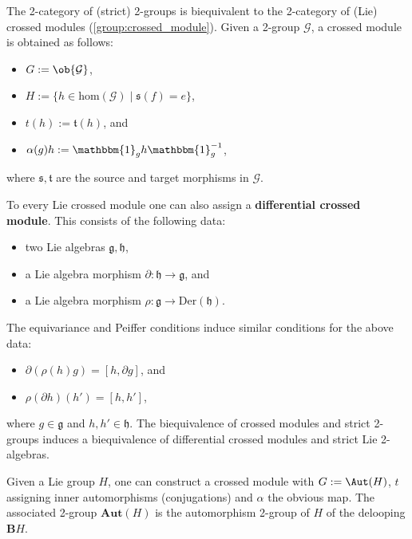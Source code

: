     \begin{property}
        The 2-category of (strict) 2-groups is biequivalent to the 2-category of (Lie) crossed modules (\cref{group:crossed_module}). Given a 2-group $\mathcal{G}$, a crossed module is obtained as follows:
        \begin{itemize}
            \item $G:=\ob{\mathcal{G}}$,
            \item $H:=\{h\in\mathrm{hom}(\mathcal{G})\mid\mathfrak{s}(f)=e\}$,
            \item $t(h):=\mathfrak{t}(h)$, and
            \item $\alpha(g)h := \mathbbm{1}_gh\mathbbm{1}_g^{-1}$,
        \end{itemize}
        where $\mathfrak{s},\mathfrak{t}$ are the source and target morphisms in $\mathcal{G}$.

        To every Lie crossed module one can also assign a \textbf{differential crossed module}. This consists of the following data:
        \begin{itemize}
            \item two Lie algebras $\mathfrak{g},\mathfrak{h}$,
            \item a Lie algebra morphism $\partial:\mathfrak{h}\rightarrow\mathfrak{g}$, and
            \item a Lie algebra morphism $\rho:\mathfrak{g}\rightarrow\text{Der}(\mathfrak{h})$.
        \end{itemize}
        The equivariance and Peiffer conditions induce similar conditions for the above data:
        \begin{itemize}
            \item $\partial(\rho(h)g) = [h,\partial g]$, and
            \item $\rho(\partial h)(h') = [h,h']$,
        \end{itemize}
        where $g\in\mathfrak{g}$ and $h,h'\in\mathfrak{h}$. The biequivalence of crossed modules and strict 2-groups induces a biequivalence of differential crossed modules and strict Lie 2-algebras.
    \end{property}

    \begin{example}
        Given a Lie group $H$, one can construct a crossed module with $G:=\Aut(H)$, $t$ assigning inner automorphisms (conjugations) and $\alpha$ the obvious map. The associated 2-group $\mathbf{Aut}(H)$ is the automorphism 2-group of $H$ of the delooping $\mathbf{B}H$.
    \end{example}

